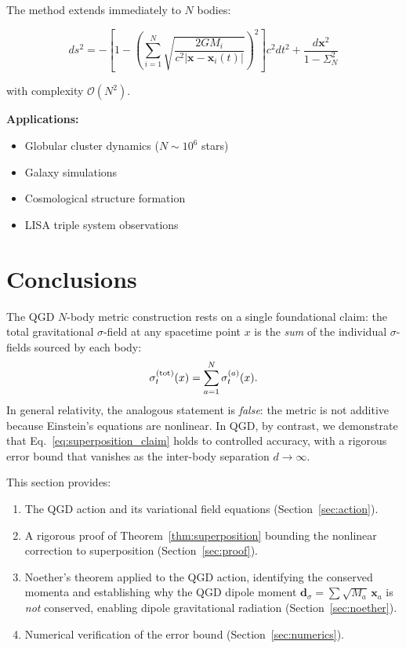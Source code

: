 \documentclass[11pt,a4paper]{article}
\theoremstyle{definition}
\theoremstyle{remark}
\newcommand{\sig}[2]{\sigma_{#1}^{(#2)}}
\newcommand{\boldx}{\mathbf{x}}
\begin{document}
	The method extends immediately to $N$ bodies:
	
	\begin{equation}\label{eq:N_body_metric}
		ds^2 = -\left[1 - \left(\sum_{i=1}^N \sqrt{\frac{2GM_i}{c^2|\mathbf{x}-\mathbf{x}_i(t)|}}\right)^2\right]c^2dt^2 + \frac{d\mathbf{x}^2}{1-\Sigma_N^2}
	\end{equation}
	
	with complexity $\mathcal{O}(N^2)$.
	
	\textbf{Applications:}
	\begin{itemize}
		\item Globular cluster dynamics ($N \sim 10^6$ stars)
		\item Galaxy simulations
		\item Cosmological structure formation
		\item LISA triple system observations
	\end{itemize}
	
	\section{Conclusions}
	
	The QGD $N$-body metric construction rests on a single foundational
	claim: the total gravitational $\sigma$-field at any spacetime point
	$x$ is the \emph{sum} of the individual $\sigma$-fields sourced by
	each body:
	\begin{equation}
		\sigma_t^{(\rm tot)}(x)
		= \sum_{a=1}^{N} \sig{t}{a}(x).
		\label{eq:superposition_claim}
	\end{equation}
	In general relativity, the analogous statement is \emph{false}: the
	metric is not additive because Einstein's equations are nonlinear.
	In QGD, by contrast, we demonstrate that Eq.~\eqref{eq:superposition_claim}
	holds to controlled accuracy, with a rigorous error bound that vanishes
	as the inter-body separation $d\to\infty$.
	
	This section provides:
	\begin{enumerate}
		\item The QGD action and its variational field equations
		(Section~\ref{sec:action}).
		\item A rigorous proof of Theorem~\ref{thm:superposition} bounding
		the nonlinear correction to superposition
		(Section~\ref{sec:proof}).
		\item Noether's theorem applied to the QGD action, identifying the
		conserved momenta and establishing why the QGD dipole moment
		$\boldsymbol{d}_\sigma = \sum\sqrt{M_a}\,\boldx_a$ is \emph{not}
		conserved, enabling dipole gravitational radiation
		(Section~\ref{sec:noether}).
		\item Numerical verification of the error bound
		(Section~\ref{sec:numerics}).
	\end{enumerate}
	
\end{document}
